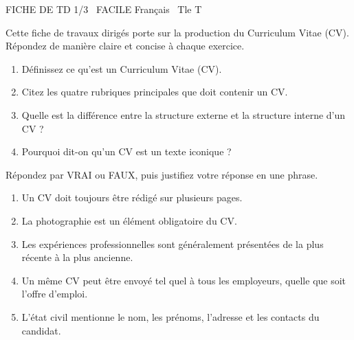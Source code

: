 \documentclass[11pt]{article}
\begin{document}
\begin{tcolorbox}[enhanced,colback=popink,colframe=popink,arc=10pt,boxrule=0pt,left=12pt,right=12pt,top=9pt,bottom=9pt]
{\color{white}\popxbold\small FICHE DE TD 1/3 \textbullet\ FACILE \hfill Français \textbullet\ Tle T\par}
\end{tcolorbox}
\vspace{4pt}
Cette fiche de travaux dirigés porte sur la production du Curriculum Vitae (CV). Répondez de manière claire et concise à chaque exercice.

\begin{exercice}
\begin{enumerate}
  \item Définissez ce qu'est un Curriculum Vitae (CV).
  \item Citez les quatre rubriques principales que doit contenir un CV.
  \item Quelle est la différence entre la structure externe et la structure interne d'un CV ?
  \item Pourquoi dit-on qu'un CV est un texte iconique ?
\end{enumerate}
\end{exercice}

\begin{exercice}
Répondez par VRAI ou FAUX, puis justifiez votre réponse en une phrase.
\begin{enumerate}
  \item Un CV doit toujours être rédigé sur plusieurs pages.
  \item La photographie est un élément obligatoire du CV.
  \item Les expériences professionnelles sont généralement présentées de la plus récente à la plus ancienne.
  \item Un même CV peut être envoyé tel quel à tous les employeurs, quelle que soit l'offre d'emploi.
  \item L'état civil mentionne le nom, les prénoms, l'adresse et les contacts du candidat.
\end{enumerate}
\end{exercice}
\end{document}
